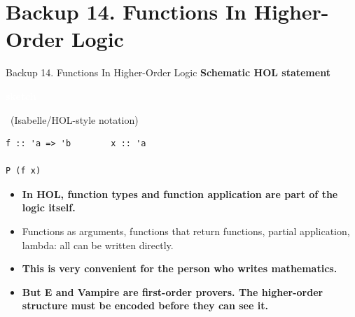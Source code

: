 \documentclass[aspectratio=169,11pt]{beamer}
\newcommand{\statusbadge}[2]{\colorbox{#1}{\textcolor{white}{\strut\scriptsize\sffamily\bfseries #2}}}
\newcommand{\badgeSketch}{\statusbadge{orange!75!black}{sketch}}
\begin{document}
\section{Backup 14. Functions In Higher-Order Logic}
\begin{frame}[fragile,t]{Backup 14. Functions In Higher-Order Logic}
\smallskip
\textbf{Schematic HOL statement}~\badgeSketch~{\footnotesize(Isabelle/HOL-style notation)}
\begin{lstlisting}[language={},basicstyle=\ttfamily\small]
f :: 'a => 'b        x :: 'a

P (f x)
\end{lstlisting}
\begin{itemize}
\setlength{\itemsep}{1pt}
\setlength{\parsep}{0pt}
\setlength{\parskip}{0pt}
\item \textcolor{blue!55!black}{\textbf{In HOL, function types and function application are part of the logic itself.}}
\item Functions as arguments, functions that return functions, partial application, lambda: all can be written directly.
\item \textcolor{blue!55!black}{\textbf{This is very convenient for the person who writes mathematics.}}
\item \textcolor{blue!55!black}{\textbf{But E and Vampire are first-order provers. The higher-order structure must be encoded before they can see it.}}
\end{itemize}
\end{frame}
\end{document}
